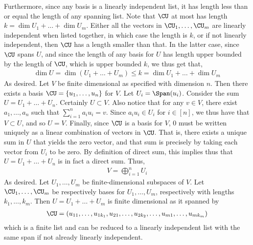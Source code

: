 \documentclass{book}
\begin{document}
\begin{enumerate}[label=\arabic*)]
      Furthermore, since any basis is a linearly independent list, it has length less than or equal the length of any spanning list. Note that $\CU$ at most has length $k =
      \dim U_1 + \dots + \dim U_m$. Either all the vectors in $\CU_1, \dots, \CU_m$ are linearly independent when listed together, in which case the length is $k$, or if not
      linearly independent, then $\CU$ has a length smaller than that. In the latter case, since $\CU$ spans $U$, and since the length of any basis for $U$ has length upper
      bounded by the length of $\CU$, which is upper bounded $k$, we thus get that,
      \begin{align*}
        \dim U = \dim(U_1 + \dots + U_m) \leq k = \dim U_1 + \dots + \dim U_m
      \end{align*}
      As desired.
    \ii
      Let $V$ be finite dimensional as specified with dimension $n$. Then there exists a basis $\CU = \{u_1, \dots, u_n\}$ for $V$. Let $U_i = \Span(u_i)$. Consider the sum
      $U = U_1 + \dots + U_n$. Certainly $U \subset V$. Also notice that for any $v \in V$, there exist $a_1, \dots, a_n$ such that $\sum_{i = 1}^{n}a_iu_i = v$. Since $a_iu_i
      \in U_i$ for $i \in [n]$, we thus have that $V \subset U$, and so $U = V$. Finally, since $\CU$ is a basis for $V$, $0$ must be written uniquely as a linear combination
      of vectors in $\CU$. That is, there exists a unique sum in $U$ that yields the zero vector, and that sum is precisely by taking each vector from $U_i$ to be zero. By
      definition of direct sum, this implies thus that $U = U_1 + \dots + U_n$ is in fact a direct sum. Thus,
      \begin{align*}
        V = \bigoplus_{i = 1}^{n}U_i
      \end{align*}
      As desired.
    \ii
      Let $U_1, \dots, U_m$ be finite-dimensional subspaces of $V$. Let $\CU_1, \dots, \CU_m$ be respectively bases for $U_1, \dots, U_m$, respectively with lengths $k_1,
      \dots, k_m$. Then $U = U_1 + \dots + U_m$ is finite dimensional as it spanned by 
      \begin{align*}
        \CU = (u_{11}, \dots, u_{1k_1}, u_{21}, \dots, u_{2k_2}, \dots, u_{m1}, \dots, u_{mk_m})
      \end{align*}
      which is a finite list and can be reduced to a linearly independent list with the same span if not already linearly independent. 


\end{enumerate}
\end{document}
